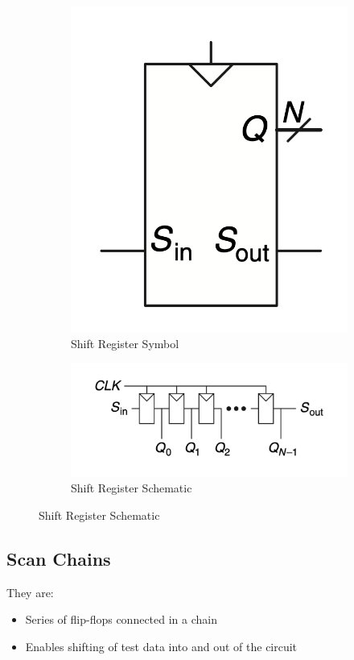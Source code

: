 \documentclass[12pt]{report}
\begin{document}
\begin{figure}[H]
    \centering
    \begin{subfigure}{0.45\textwidth}
        \centering
        \includegraphics[width=\textwidth]{shift-register_symbol.png}
        \caption{Shift Register Symbol}
    \end{subfigure}
    \hfill
    \begin{subfigure}{0.45\textwidth}
        \centering
        \includegraphics[width=\textwidth]{shift_register_schematic.png}
        \caption{Shift Register Schematic}
    \end{subfigure}
\end{figure}

\subsection{Scan Chains}
 They are:
\begin{itemize}
    \item Series of flip-flops connected in a chain
    \item Enables shifting of test data into and out of the circuit
\end{itemize}
\end{document}
